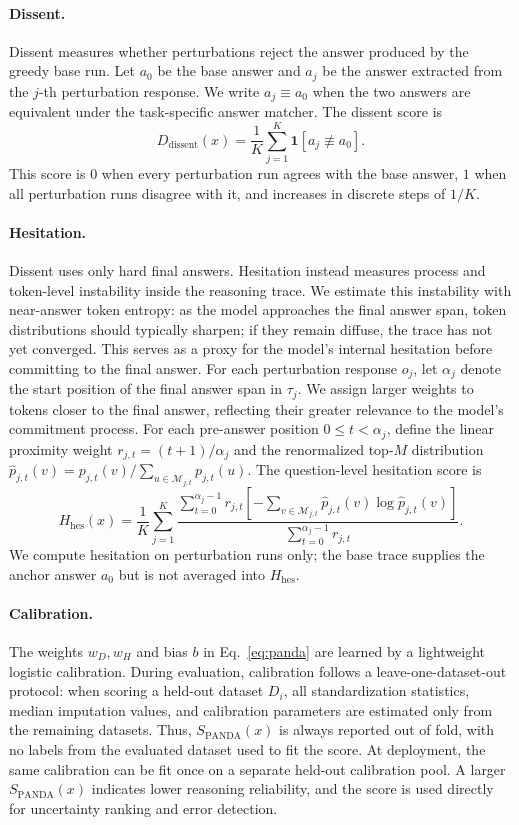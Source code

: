 \documentclass{article} %
\begin{document}
\paragraph{Dissent.}
Dissent measures whether perturbations reject the answer produced by the greedy
base run. Let $a_0$ be the base answer and $a_j$ be the answer extracted from the
$j$-th perturbation response. We write $a_j \equiv a_0$ when the two answers are
equivalent under the task-specific answer matcher. The dissent score is
\[
D_{\mathrm{dissent}}(x)
=
\frac{1}{K}
\sum_{j=1}^{K}
\mathbf{1}\!\left[a_j \not\equiv a_0\right].
\]
This score is $0$ when every perturbation run agrees with the base answer, $1$
when all perturbation runs disagree with it, and increases in discrete steps of
$1/K$.

\paragraph{Hesitation.}
Dissent uses only hard final answers.
Hesitation instead measures process and token-level instability inside the
reasoning trace.
We estimate this instability with near-answer token entropy:
as the model approaches the final answer span, token distributions should
typically sharpen; if they remain diffuse, the trace has not yet converged.
This serves as a proxy for the model's internal hesitation before committing to
the final answer.
For each perturbation response $o_j$, let $\alpha_j$ denote the start position
of the final answer span in $\tau_j$. We assign larger weights to tokens closer to the final answer, reflecting their greater relevance to the model's commitment process.
For each pre-answer position $0 \leq t < \alpha_j$, define the linear proximity
weight $r_{j,t}=(t+1)/\alpha_j$ and the renormalized top-$M$ distribution
$\hat{p}_{j,t}(v)=p_{j,t}(v)/\sum_{u\in\mathcal{M}_{j,t}}p_{j,t}(u)$.
The question-level hesitation score is
\[
H_{\mathrm{hes}}(x)
=
\frac{1}{K}
\sum_{j=1}^{K}
\frac{
\sum_{t=0}^{\alpha_j-1}
r_{j,t}
\left[
-\sum_{v\in\mathcal{M}_{j,t}}
\hat{p}_{j,t}(v)\log \hat{p}_{j,t}(v)
\right]
}{
\sum_{t=0}^{\alpha_j-1} r_{j,t}
}.
\]
We compute hesitation on perturbation runs only; the base trace supplies the
anchor answer $a_0$ but is not averaged into $H_{\mathrm{hes}}$.

\paragraph{Calibration.}
The weights $w_D,w_H$ and bias $b$ in Eq.~\ref{eq:panda} are learned by a
lightweight logistic calibration.
During evaluation, calibration follows a leave-one-dataset-out protocol: when
scoring a held-out dataset $D_i$, all standardization statistics, median
imputation values, and calibration parameters are estimated only from the
remaining datasets.
Thus, $S_{\mathrm{PANDA}}(x)$ is always reported out of fold, with no labels from
the evaluated dataset used to fit the score.
At deployment, the same calibration can be fit once on a separate held-out
calibration pool.
A larger $S_{\mathrm{PANDA}}(x)$ indicates lower reasoning reliability, and the
score is used directly for uncertainty ranking and error detection.
\end{document}
